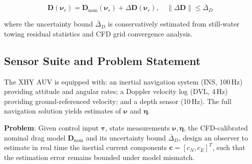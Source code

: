 \begin{equation}
    \bm{D}(\bm{\nu}_r) = \bm{D}_{\text{nom}}(\bm{\nu}_r) + \Delta\bm{D}(\bm{\nu}_r), \quad \|\Delta\bm{D}\| \leq \bar{\Delta}_D
    \label{eq:uncertainty}
\end{equation}

where the uncertainty bound $\bar{\Delta}_D$ is conservatively estimated from still-water towing residual statistics and CFD grid convergence analysis.

\subsection{Sensor Suite and Problem Statement}

The XHY AUV is equipped with: an inertial navigation system (INS, 100\,Hz) providing attitude and angular rates; a Doppler velocity log (DVL, 4\,Hz) providing ground-referenced velocity; and a depth sensor (10\,Hz). The full navigation solution yields estimates of $\bm{\nu}$ and $\bm{\eta}$.

\textbf{Problem}: Given control input $\bm{\tau}$, state measurements $\bm{\nu},\bm{\eta}$, the CFD-calibrated nominal drag model $\bm{D}_{\text{nom}}$ and its uncertainty bound $\bar{\Delta}_D$, design an observer to estimate in real time the inertial current components $\bm{c}=[c_N,c_E]^T$, such that the estimation error remains bounded under model mismatch.
